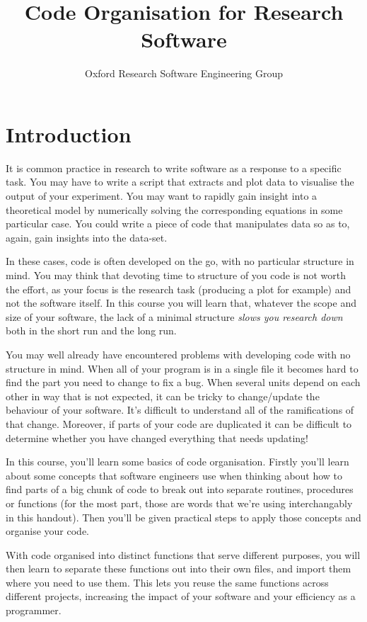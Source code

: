 \documentclass[a4paper]{article}
\begin{document}
\title{Code Organisation for Research Software}
\author{Oxford Research Software Engineering Group}
\maketitle

\section{Introduction}
It is common practice in research to write software as a response to a specific task.
You may have to write a script that extracts and plot data to visualise the output of your experiment.
You may want to rapidly gain insight into a theoretical model by numerically solving the corresponding equations in some particular case.
You could write a piece of code that manipulates data so as to, again, gain insights into the data-set.

In these cases, code is often developed on the go, with no particular structure in mind.
You may think that devoting time to structure of you code is not worth the effort, as your focus is the research task (producing a plot for example) and not the software itself.
In this course you will learn that, whatever the scope and size of your software, the lack of a minimal structure \textit{slows you research down} both in the short run and the long run.

You may well already have encountered problems with developing code with no structure in mind.
When all of your program is in a single file it becomes hard to find the part you need to change to fix a bug.
When several units depend on each other in way that is not expected, it can be tricky to change/update the behaviour of your software.
It's difficult to understand all of the ramifications of that change.
Moreover, if parts of your code are duplicated it can be difficult to determine whether you have changed everything that needs updating!

In this course, you'll learn some basics of code organisation.
Firstly you'll learn about some concepts that software engineers use when thinking about how to find parts of a big chunk of code to break out into separate routines, procedures or functions (for the most part, those are words that we're using interchangably in this handout).
Then you'll be given practical steps to apply those concepts and organise your code.

With code organised into distinct functions that serve different purposes, you will then learn to separate these functions out into their own files, and import them where you need to use them.
This lets you reuse the same functions across different projects, increasing the impact of your software and your efficiency as a programmer.
\end{document}
